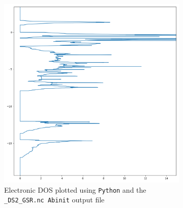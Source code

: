 \documentclass[11pt,a4paper]{article}
\begin{document}
\begin{figure}[H]
\centering
\begin{subfigure}[b]{0.6\textwidth}
\centering
\includegraphics[width=\textwidth]{images/dos2}
\caption{Electronic DOS plotted using \texttt{Python} and the \texttt{\_DS2\_GSR.nc Abinit} output file}
\label{fig:dos2}
\end{subfigure}
\hfill
\begin{subfigure}[b]{0.3\textwidth}
\centering

\end{subfigure}
\end{figure}
\end{document}
